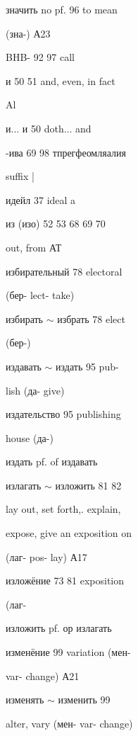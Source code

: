 \clearpage
\thispagestyle{plain}
\begingroup
\cyrillicfont
\fontsize{7.25}{8.25}\selectfont
\setlength{\parindent}{0pt}
\setlength{\parskip}{0pt}
\setlength{\emergencystretch}{1.5em}
\noindent
\begin{minipage}[t]{0.475\textwidth}
\raggedright
\noindent значить no pf. 96 to mean\par
\noindent (зна-) А23\par
\noindent BHB- 92 97 call\par
\noindent и 50 51 and, even, in fact\par
\noindent Al\par
\noindent и... и 50 doth... and\par
\noindent -ива 69 98 тпрегфеомляалия\par
\noindent suffix |\par
\noindent идейл 37 ideal a\par
\noindent из (изо) 52 53 68 69 70\par
\noindent out, from АТ\par
\noindent избирательный 78 electoral\par
\noindent (бер- lect- take)\par
\noindent избирать $\sim$ избрать 78 elect\par
\noindent (бер-)\par
\noindent издавать $\sim$ издать 95 pub-\par
\noindent lish (да- give)\par
\noindent издательство 95 publishing\par
\noindent house (да-)\par
\noindent издать pf. of издавать\par
\noindent излагать $\sim$ изложить 81 82\par
\noindent lay out, set forth,. explain,\par
\noindent expose, give an exposition on\par
\noindent (лаг- pos- lay) А17\par
\noindent изложёние 73 81 exposition\par
\noindent (лаг-\par
\noindent изложить pf. ор излагать\par
\noindent изменёние 99 variation (мен-\par
\noindent var- change) А21\par
\noindent изменять $\sim$ изменить 99\par
\noindent alter, vary (мен- var- change)\par

\end{minipage}
